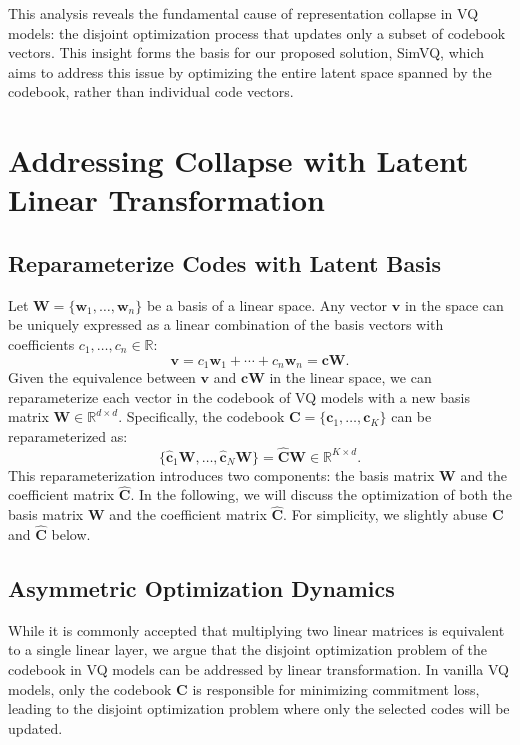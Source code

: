 This analysis reveals the fundamental cause of representation collapse in VQ models: the disjoint optimization process that updates only a subset of codebook vectors. This insight forms the basis for our proposed solution, SimVQ, which aims to address this issue by optimizing the entire latent space spanned by the codebook, rather than individual code vectors.



\section{Addressing Collapse with Latent Linear Transformation}

\subsection{Reparameterize Codes with Latent Basis}

Let $\bm{W}=\{\bm{w}_1,\ldots ,\bm{w}_n\}$ be a basis of a linear space. Any vector $\bm{v}$ in the space can be uniquely expressed as a linear combination of the basis vectors with coefficients $c_1,\ldots,c_n \in \mathbb{R}$:
\begin{equation}
    \bm{v} = c_1\bm{w}_1+\cdots+c_n\bm{w}_n = \bm{c}\bm{W}.
\end{equation}
Given the equivalence between $\bm{v}$ and $\bm{c}\bm{W}$ in the linear space, we can reparameterize each vector in the codebook of VQ models with a new basis matrix $\bm{W}\in \mathbb{R}^{d\times d}$. Specifically, the codebook $\bm{C}=\{\bm{c}_1,\ldots,\bm{c}_K\}$ can be reparameterized as:
\begin{equation}
    \{\bm{\hat{c}}_1\bm{W},\ldots,\bm{\hat{c}}_N\bm{W}\}=\bm{\hat{C}}\bm{W}\in \mathbb{R}^{K\times d}.
\end{equation}
This reparameterization introduces two components: the basis matrix $\bm{W}$ and the coefficient matrix $\bm{\hat{C}}$. In the following, we will discuss the optimization of both the basis matrix $\bm{W}$ and the coefficient matrix $\bm{\hat{C}}$. For simplicity, we slightly abuse $\bm{C}$ and $\bm{\hat{C}}$ below.




\subsection{Asymmetric Optimization Dynamics}

While it is commonly accepted that multiplying two linear matrices is equivalent to a single linear layer, we argue that the disjoint optimization problem of the codebook in VQ models can be addressed by linear transformation. In vanilla VQ models, only the codebook $\bm{C}$ is responsible for minimizing commitment loss, leading to the disjoint optimization problem where only the selected codes will be updated. 

